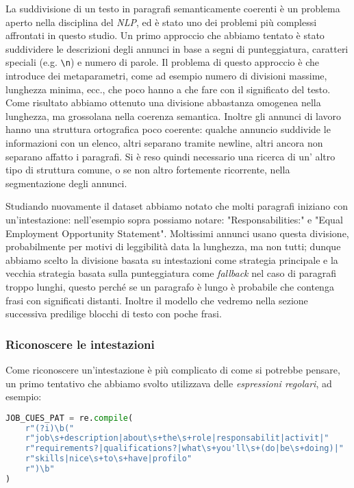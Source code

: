 \noindent La suddivisione di un testo in paragrafi semanticamente coerenti è un problema aperto nella disciplina del \textit{NLP}, ed è stato uno dei problemi più complessi affrontati in questo studio. Un primo approccio che abbiamo tentato è stato suddividere le descrizioni degli annunci in base a segni di punteggiatura, caratteri speciali (e.g. \texttt{\textbackslash n}) e numero di parole. Il problema di questo approccio è che introduce dei metaparametri, come ad esempio numero di divisioni massime, lunghezza minima, ecc., che poco hanno a che fare con il significato del testo. Come risultato abbiamo ottenuto una divisione abbastanza omogenea nella lunghezza, ma grossolana nella coerenza semantica. Inoltre gli annunci di lavoro hanno una struttura ortografica poco coerente: qualche annuncio suddivide le informazioni con un elenco, altri separano tramite newline, altri ancora non separano affatto i paragrafi. Si è reso quindi necessario una ricerca di un' altro tipo di struttura comune, o se non altro fortemente ricorrente, nella segmentazione degli annunci.

\medskip

\noindent Studiando nuovamente il dataset abbiamo notato che molti paragrafi iniziano con un'intestazione: nell'esempio sopra possiamo notare: "Responsabilities:" e "Equal Employment Opportunity Statement". Moltissimi annunci usano questa divisione, probabilmente  per motivi di leggibilità data la lunghezza, ma non tutti; dunque abbiamo scelto la divisione basata su intestazioni come strategia principale e la vecchia strategia basata sulla punteggiatura come \textit{fallback} nel caso di paragrafi troppo lunghi, questo perché se un paragrafo è lungo è probabile che contenga frasi con significati distanti. Inoltre il modello che vedremo nella sezione successiva predilige blocchi di testo con poche frasi.

\medskip
\subsubsection{Riconoscere le intestazioni}
\noindent Come riconoscere un'intestazione è più complicato di come si potrebbe pensare, un primo tentativo che abbiamo svolto utilizzava delle \textit{espressioni regolari}, ad esempio:

\begin{lstlisting}[language=python]
JOB_CUES_PAT = re.compile(
    r"(?i)\b("
    r"job\s+description|about\s+the\s+role|responsabilit|activit|"
    r"requirements?|qualifications?|what\s+you'll\s+(do|be\s+doing)|"
    r"skills|nice\s+to\s+have|profilo"
    r")\b"
)
\end{lstlisting}

